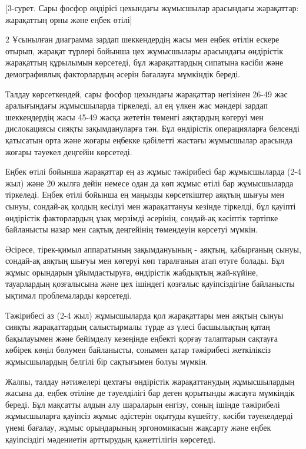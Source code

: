 [3-сурет. Сары фосфор өндірісі
цехындағы жұмысшылар арасындағы жарақаттар: жарақаттың орны және еңбек
өтілі]

\begin{multicols}{2}
Ұсынылған диаграмма зардап шеккендердің жасы мен еңбек өтілін ескере
отырып, жарақат түрлері бойынша цех жұмысшылары арасындағы өндірістік
жарақаттың құрылымын көрсетеді, бұл жарақаттардың сипатына кәсіби және
демографиялық факторлардың әсерін бағалауға мүмкіндік береді.

Талдау көрсеткендей, сары фосфор цехындағы жарақаттар негізінен 26-49
жас аралығындағы жұмысшыларда тіркеледі, ал ең үлкен жас мәндері зардап
шеккендердің жасы 45-49 жасқа жететін төменгі аяқтардың көгеруі мен
дислокациясы сияқты зақымдануларға тән. Бұл өндірістік операцияларға
белсенді қатысатын орта және жоғары еңбекке қабілетті жастағы жұмысшылар
арасында жоғары тәуекел деңгейін көрсетеді.

Еңбек өтілі бойынша жарақаттар ең аз жұмыс тәжірибесі бар жұмысшыларда
(2-4 жыл) және 20 жылға дейін немесе одан да көп жұмыс өтілі бар
жұмысшыларда тіркеледі. Еңбек өтілі бойынша ең маңызды көрсеткіштер
аяқтың шығуы мен сынуы, сондай-ақ қолдың кесілуі мен жарақаттануы
кезінде тіркелді, бұл қауіпті өндірістік факторлардың ұзақ мерзімді
әсерінің, сондай-ақ кәсіптік тәртіпке байланысты назар мен сақтық
деңгейінің төмендеуін көрсетуі мүмкін.

Әсіресе, тірек-қимыл аппаратының зақымдануының - аяқтың, қабырғаның
сынуы, сондай-ақ аяқтың шығуы мен көгеруі көп таралғанын атап өтуге
болады. Бұл жұмыс орындарын ұйымдастыруға, өндірістік жабдықтың
жай-күйіне, тауарлардың қозғалысына және цех ішіндегі қозғалыс
қауіпсіздігіне байланысты ықтимал проблемаларды көрсетеді.

Тәжірибесі аз (2-4 жыл) жұмысшыларда қол жарақаттары мен аяқтың сынуы
сияқты жарақаттардың салыстырмалы түрде аз үлесі басшылықтың қатаң
бақылауымен және бейімделу кезеңінде еңбекті қорғау талаптарын сақтауға
көбірек көңіл бөлумен байланысты, сонымен қатар тәжірибесі жеткіліксіз
жұмысшылардың белгілі бір сақтығымен болуы мүмкін.

Жалпы, талдау нәтижелері цехтағы өндірістік жарақаттанудың жұмысшылардың
жасына да, еңбек өтіліне де тәуелділігі бар деген қорытынды жасауға
мүмкіндік береді. Бұл мақсатты алдын алу шараларын енгізу, соның ішінде
тәжірибелі жұмысшыларға қауіпсіз жұмыс әдістерін оқытуды күшейту, кәсіби
тәуекелдерді үнемі бағалау, жұмыс орындарының эргономикасын жақсарту
және еңбек қауіпсіздігі мәдениетін арттырудың қажеттілігін көрсетеді.


\end{multicols}
